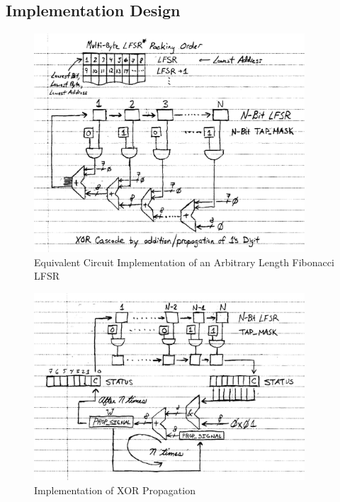 \documentclass[11pt]{article}
\begin{document}
\subsection{Implementation Design}

\begin{figure}
	\centering
	\includegraphics[width=0.9\textwidth]{Figures/fibonacci-equivalent-circuit.pdf}
	\caption{Equivalent Circuit Implementation of an Arbitrary Length Fibonacci LFSR}
	\label{fibonacci-equivalent-circuit}
\end{figure}

\begin{figure}
	\centering
	\includegraphics[width=0.9\textwidth]{Figures/xor-propagation-flowchart.pdf}
	\caption{Implementation of XOR Propagation}
	\label{xor-propagation-flowchart}
\end{figure}
\end{document}
